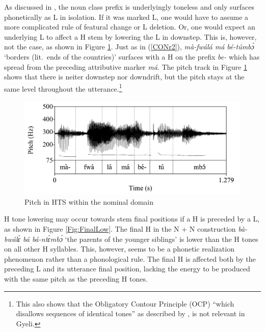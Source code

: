 As discussed in , the noun class prefix is underlyingly toneless and only surfaces phonetically as L in isolation. If it was marked L, one would have to assume a more complicated rule of featural change or L deletion. Or, one would expect an underlying L to affect a H stem by lowering the L in downstep.   This is, however, not the case, as shown in Figure \ref{Fig:pitchHTS}. Just as in (\ref{CONr2}), {\itshape mà-fwálá má bé-túmbɔ́} `borders (lit.\ ends of the countries)' surfaces with a H on the prefix {\itshape be-} which has spread from the preceding attributive marker {\itshape má}. The pitch track in Figure \ref{Fig:pitchHTS} shows that there is neiter downstep nor downdrift, but the pitch stays at the same level throughout the utterance.\footnote{This also shows that the Obligatory Contour Principle (OCP) ``which disallows sequences of identical tones'' as described by \citet[52]{yip2002}, is not relevant in Gyeli.}

\begin{figure} 
\centering
\includegraphics[width=\textwidth]{figures/H-plateau.jpg}
\caption{Pitch in HTS within the nominal domain}
\label{Fig:pitchHTS}
\end{figure}

H tone lowering may occur towards stem final positions if a H is preceded by a L, as shown in Figure \ref{Fig:FinalLow}. The final H in the N + N construction {\itshape bà-bwálɛ̀ bá bá-ntɛ̀mbɔ́} `the parents of the younger siblings' is lower than the H tones on all other H syllables.  This, however, seems to be a phonetic realization phenomenon rather than a phonological rule. The final H is affected both by the preceding L and its utterance final position, lacking the energy to be produced with the same pitch as the preceding H tones.


